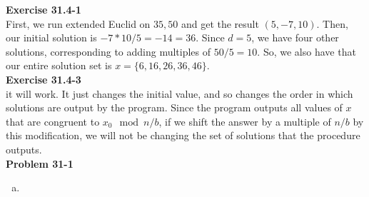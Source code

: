 \documentclass{article}
\begin{document}
\noindent\textbf{Exercise 31.4-1}\\
First, we run extended Euclid on $35,50$ and get the result $(5,-7,10)$. Then, our initial solution is $-7*10/5 = -14 = 36$. Since $d=5$, we have four other solutions, corresponding to adding multiples of $50/5 =10$. So, we also have that our entire solution set is $x =\{6,16,26,36,46\}$.\\



\noindent\textbf{Exercise 31.4-3}\\
it will work. It just changes the initial value, and so changes the order in which solutions are output by the program. Since the program outputs all values of $x$ that are congruent to $x_0 \mod n/b$, if we shift the answer by a multiple of $n/b$ by this modification, we will not be changing the set of solutions that the procedure outputs.\\



\noindent\textbf{Problem 31-1}\\

\begin{enumerate}[a.]
\item
\end{enumerate}
\end{document}
